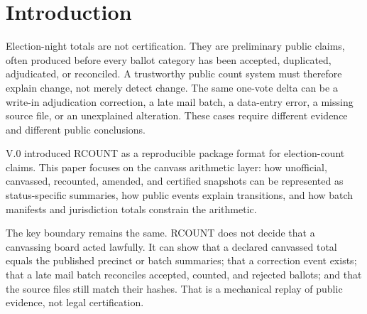 \section{Introduction}

Election-night totals are not certification. They are preliminary public
claims, often produced before every ballot category has been accepted,
duplicated, adjudicated, or reconciled. A trustworthy public count system must
therefore explain change, not merely detect change. The same one-vote delta can
be a write-in adjudication correction, a late mail batch, a data-entry error, a
missing source file, or an unexplained alteration. These cases require different
evidence and different public conclusions.

V.0 introduced RCOUNT as a reproducible package format for election-count
claims. This paper focuses on the canvass arithmetic layer: how unofficial,
canvassed, recounted, amended, and certified snapshots can be represented as
status-specific summaries, how public events explain transitions, and how batch
manifests and jurisdiction totals constrain the arithmetic.

The key boundary remains the same. RCOUNT does not decide that a canvassing
board acted lawfully. It can show that a declared canvassed total equals the
published precinct or batch summaries; that a correction event exists; that a
late mail batch reconciles accepted, counted, and rejected ballots; and that the
source files still match their hashes. That is a mechanical replay of public
evidence, not legal certification.

